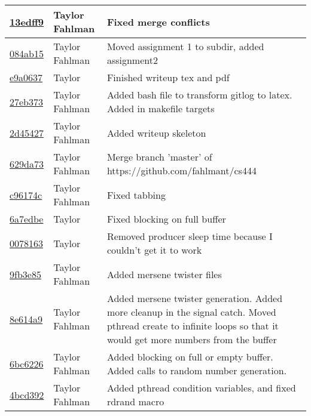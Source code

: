 \begin{tabular}{l l l}
\href{git@github.com:fahlmant/cs444/commit/13edff973f75105ee082af2453bb0ea1789c6823}{13edff9} & Taylor Fahlman & Fixed merge conflicts\\\hline
\href{git@github.com:fahlmant/cs444/commit/084ab1563492ad141bbbf835df613426e6070df2}{084ab15} & Taylor Fahlman & Moved assignment 1 to subdir, added assignment2\\\hline
\href{git@github.com:fahlmant/cs444/commit/e9a06375c5e5ee5232d5a3a71fa1dd1ac336b7cc}{e9a0637} & Taylor & Finished writeup tex and pdf\\\hline
\href{git@github.com:fahlmant/cs444/commit/27eb37349447092eec979e1d09531408f38ac661}{27eb373} & Taylor Fahlman & Added bash file to transform gitlog to latex. Added in makefile targets\\\hline
\href{git@github.com:fahlmant/cs444/commit/2d454270c6b79091f4c1363da7185e3ffbcb2301}{2d45427} & Taylor Fahlman & Added writeup skeleton\\\hline
\href{git@github.com:fahlmant/cs444/commit/629da73d1a287be9db4919d9bc27c987acfb7128}{629da73} & Taylor Fahlman & Merge branch 'master' of https://github.com/fahlmant/cs444\\\hline
\href{git@github.com:fahlmant/cs444/commit/c96174c136e9194fd83f4d5fee5927432468fdfd}{c96174c} & Taylor Fahlman & Fixed tabbing\\\hline
\href{git@github.com:fahlmant/cs444/commit/6a7edbe421fb5e53a9a847a09117500c1ca1482e}{6a7edbe} & Taylor & Fixed blocking on full buffer\\\hline
\href{git@github.com:fahlmant/cs444/commit/007816390983ac7d562e8f9d4d31ff6abc7c40c8}{0078163} & Taylor & Removed producer sleep time because I couldn't get it to work\\\hline
\href{git@github.com:fahlmant/cs444/commit/9fb3e850a20f58cd174a80bf580c150ebb8a8860}{9fb3e85} & Taylor Fahlman & Added mersene twister files\\\hline
\href{git@github.com:fahlmant/cs444/commit/8e614a90d9b3adfedea1214253801c36f17c6aea}{8e614a9} & Taylor Fahlman & Added mersene twister generation. Added more cleanup in the signal catch. Moved pthread create to infinite loops so that it would get more numbers from the buffer\\\hline
\href{git@github.com:fahlmant/cs444/commit/6bc6226e01a9a1302c741331cce8ab8256f399ce}{6bc6226} & Taylor Fahlman & Added blocking on full or empty buffer. Added calls to random number generation.\\\hline
\href{git@github.com:fahlmant/cs444/commit/4bcd392bf2941eb49cc82229be9495cd4c9f62ee}{4bcd392} & Taylor Fahlman & Added pthread condition variables, and fixed rdrand macro\\\hline

\end{tabular}
